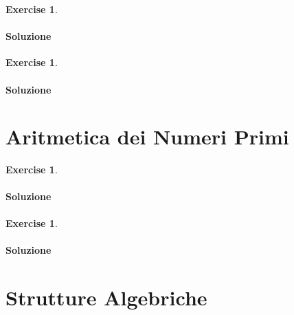 \documentclass{article}
\theoremstyle{plain}
\theoremstyle{definition}
\newtheorem{xca}[exmp]{Exercise}
\theoremstyle{remark}
\begin{document}
\begin{bxthm}
\begin{xca}

\end{xca}
\end{bxthm}
\paragraph{Soluzione}

\vspace{10pt}

\begin{bxthm}
\begin{xca}

\end{xca}
\end{bxthm}
\paragraph{Soluzione}

\newpage
\section{Aritmetica dei Numeri Primi}
\vspace{20pt}

\vspace{10pt}

\begin{bxthm}
\begin{xca}

\end{xca}
\end{bxthm}
\paragraph{Soluzione}

\vspace{10pt}

\begin{bxthm}
\begin{xca}

\end{xca}
\end{bxthm}
\paragraph{Soluzione}

\newpage
\section{Strutture Algebriche}
\vspace{20pt}
\end{document}
